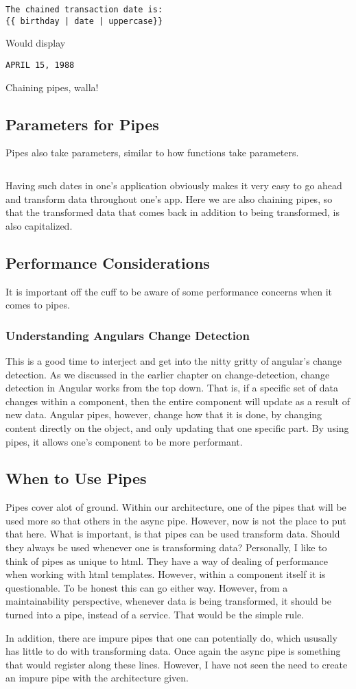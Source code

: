 \begin{lstlisting}
The chained transaction date is:
{{ birthday | date | uppercase}}
\end{lstlisting}

Would display
\begin{verbatim}
APRIL 15, 1988
\end{verbatim}

Chaining pipes, walla!

\subsection{Parameters for Pipes}
Pipes also take parameters, similar to how functions take parameters.

\begin{lstlisting}

\end{lstlisting}

Having such dates in one's application obviously makes it very easy to go ahead
and transform data throughout one's app. Here we are also chaining pipes, so
that the transformed data that comes back in addition to being transformed, is
also capitalized.

\subsection{ Performance Considerations }
It is important off the cuff to be aware of some performance concerns when it
comes to pipes.

\subsubsection{ Understanding Angulars Change Detection }
This is a good time to interject and get into the nitty gritty of angular's
change detection. As we discussed in the earlier chapter on change-detection,
change detection in Angular works from the top down. That is, if a specific set
of data changes within a component, then the entire component will update as a
result of new data. Angular pipes, however, change how that it is done, by
changing content directly on the object, and only updating that one specific
part. By using pipes, it allows one's component to be more performant.

\subsection{ When to Use Pipes }
Pipes cover alot of ground. Within our architecture, one of the pipes that will
be used more so that others in the async pipe. However, now is not the place
to put that here. What is important, is that pipes can be used transform data.
Should they always be used whenever one is transforming data? Personally,
I like to think of pipes as unique to html. They have a way of dealing of
performance when working with html templates. However, within a component
itself it is questionable. To be honest this can go either way. However, from a
maintainability perspective, whenever data is being transformed, it should be
turned into a pipe, instead of a service. That would be the simple rule.

In addition, there are impure pipes that one can potentially do, which ususally
has little to do with transforming data. Once again the async pipe is something
that would register along these lines. However, I have not seen the need to
create an impure pipe with the architecture given.
